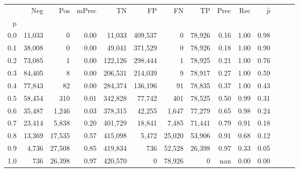 \begin{tabular}{rrrrrrrrrrrrrr}
\toprule
{} &     Neg &     Pos & mPrec &       TN &       FP &      FN &      TP &  Prec &   Rec & $\hat{p}$ \\
p   &         &         &       &          &          &         &         &       &       &           \\
\midrule
0.0 &  11,033 &       0 &  0.00 &   11,033 &  409,537 &       0 &  78,926 &  0.16 &  1.00 &      0.98 \\
0.1 &  38,008 &       0 &  0.00 &   49,041 &  371,529 &       0 &  78,926 &  0.18 &  1.00 &      0.90 \\
0.2 &  73,085 &       1 &  0.00 &  122,126 &  298,444 &       1 &  78,925 &  0.21 &  1.00 &      0.76 \\
0.3 &  84,405 &       8 &  0.00 &  206,531 &  214,039 &       9 &  78,917 &  0.27 &  1.00 &      0.59 \\
0.4 &  77,843 &      82 &  0.00 &  284,374 &  136,196 &      91 &  78,835 &  0.37 &  1.00 &      0.43 \\
0.5 &  58,454 &     310 &  0.01 &  342,828 &   77,742 &     401 &  78,525 &  0.50 &  0.99 &      0.31 \\
0.6 &  35,487 &   1,246 &  0.03 &  378,315 &   42,255 &   1,647 &  77,279 &  0.65 &  0.98 &      0.24 \\
0.7 &  23,414 &   5,838 &  0.20 &  401,729 &   18,841 &   7,485 &  71,441 &  0.79 &  0.91 &      0.18 \\
0.8 &  13,369 &  17,535 &  0.57 &  415,098 &    5,472 &  25,020 &  53,906 &  0.91 &  0.68 &      0.12 \\
0.9 &   4,736 &  27,508 &  0.85 &  419,834 &      736 &  52,528 &  26,398 &  0.97 &  0.33 &      0.05 \\
1.0 &     736 &  26,398 &  0.97 &  420,570 &        0 &  78,926 &       0 &   nan &  0.00 &      0.00 \\
\bottomrule
\end{tabular}
